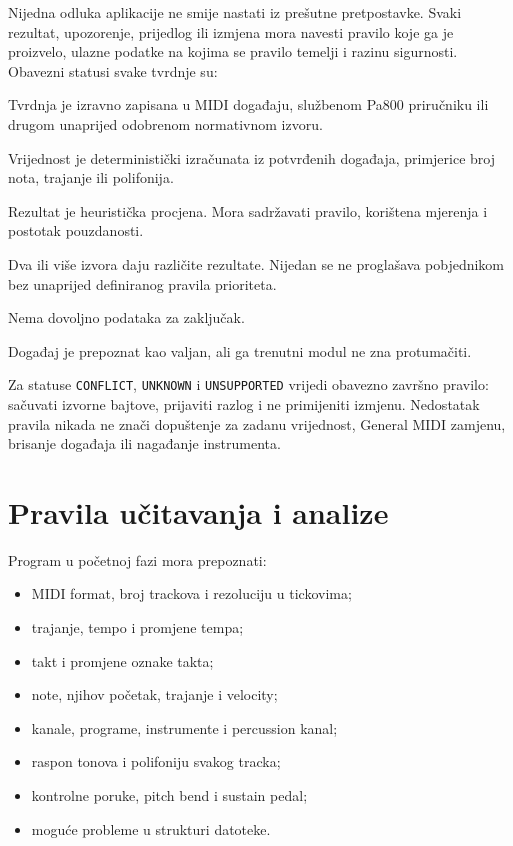 \documentclass[11pt]{article}
\begin{document}
Nijedna odluka aplikacije ne smije nastati iz prešutne pretpostavke. Svaki
rezultat, upozorenje, prijedlog ili izmjena mora navesti pravilo koje ga je
proizvelo, ulazne podatke na kojima se pravilo temelji i razinu sigurnosti.
Obavezni statusi svake tvrdnje su:

\begin{description}[style=nextline]
    \item[\texttt{CONFIRMED}] Tvrdnja je izravno zapisana u MIDI događaju,
    službenom Pa800 priručniku ili drugom unaprijed odobrenom normativnom
    izvoru.
    \item[\texttt{DERIVED}] Vrijednost je deterministički izračunata iz
    potvrđenih događaja, primjerice broj nota, trajanje ili polifonija.
    \item[\texttt{INFERRED}] Rezultat je heuristička procjena. Mora sadržavati
    pravilo, korištena mjerenja i postotak pouzdanosti.
    \item[\texttt{CONFLICT}] Dva ili više izvora daju različite rezultate.
    Nijedan se ne proglašava pobjednikom bez unaprijed definiranog pravila
    prioriteta.
    \item[\texttt{UNKNOWN}] Nema dovoljno podataka za zaključak.
    \item[\texttt{UNSUPPORTED}] Događaj je prepoznat kao valjan, ali ga
    trenutni modul ne zna protumačiti.
\end{description}

Za statuse \texttt{CONFLICT}, \texttt{UNKNOWN} i \texttt{UNSUPPORTED} vrijedi
obavezno završno pravilo: sačuvati izvorne bajtove, prijaviti razlog i ne
primijeniti izmjenu. Nedostatak pravila nikada ne znači dopuštenje za zadanu
vrijednost, General MIDI zamjenu, brisanje događaja ili nagađanje instrumenta.

\section{Pravila učitavanja i analize}

Program u početnoj fazi mora prepoznati:

\begin{itemize}
    \item MIDI format, broj trackova i rezoluciju u tickovima;
    \item trajanje, tempo i promjene tempa;
    \item takt i promjene oznake takta;
    \item note, njihov početak, trajanje i velocity;
    \item kanale, programe, instrumente i percussion kanal;
    \item raspon tonova i polifoniju svakog tracka;
    \item kontrolne poruke, pitch bend i sustain pedal;
    \item moguće probleme u strukturi datoteke.
\end{itemize}
\end{document}
